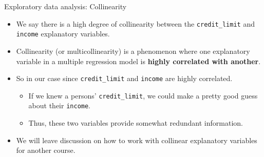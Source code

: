 \documentclass[
  ignorenonframetext,
]{beamer}
\providecommand{\tightlist}{%
  \setlength{\itemsep}{0pt}\setlength{\parskip}{0pt}}
\begin{document}
\begin{frame}[fragile]{Exploratory data analysis: Collinearity}
\label{exploratory-data-analysis-collinearity}
\begin{itemize}
\item
  We say there is a high degree of collinearity between the
  \texttt{credit\_limit} and \texttt{income} explanatory variables.
\item
  Collinearity (or multicollinearity) is a phenomenon where one
  explanatory variable in a multiple regression model is \textbf{highly
  correlated with another}.
\item
  So in our case since \texttt{credit\_limit} and \texttt{income} are
  highly correlated.

  \begin{itemize}
  \tightlist
  \item
    If we knew a persons' \texttt{credit\_limit}, we could make a pretty
    good guess about their \texttt{income}.
  \item
    Thus, these two variables provide somewhat redundant information.
  \end{itemize}
\item
  We will leave discussion on how to work with collinear explanatory
  variables for another course.
\end{itemize}
\end{frame}
\end{document}
